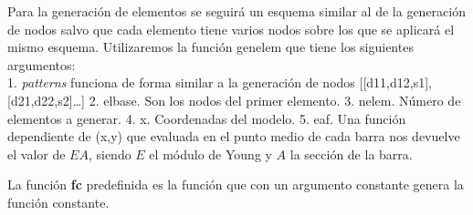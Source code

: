\documentclass[11pt]{article}
\begin{document}
Para la generación de elementos se seguirá un esquema similar al de la
generación de nodos salvo que cada elemento tiene varios nodos sobre los
que se aplicará el mismo esquema. Utilizaremos la función genelem que
tiene los siguientes argumentos:\\
1. \emph{patterns} funciona de forma similar a la generación de nodos
{[}{[}d11,d12,s1{]},{[}d21,d22,s2{]}\ldots{]} 2. elbase. Son los nodos
del primer elemento. 3. nelem. Número de elementos a generar. 4. x.
Coordenadas del modelo. 5. eaf. Una función dependiente de (x,y) que
evaluada en el punto medio de cada barra nos devuelve el valor de
$EA$, siendo $E$ el módulo de Young y $A$ la sección de la barra.

La función \textbf{fc} predefinida es la función que con un argumento
constante genera la función constante.
\end{document}
